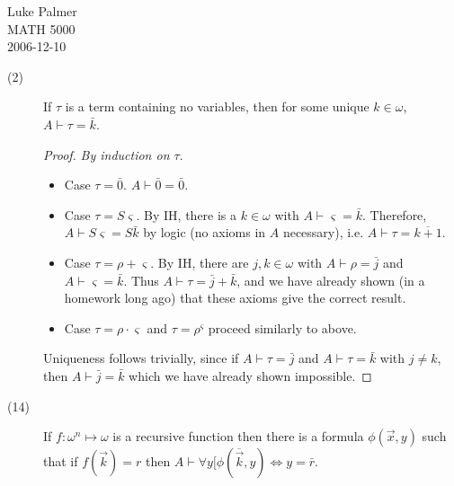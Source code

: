 \documentclass[12pt]{article}
\newcommand{\proves}[0]{\vdash}
\begin{document}
\noindent Luke Palmer \\
MATH 5000 \\
2006-12-10

\begin{description}
\item[(2)] If $\tau$ is a term containing no variables, then for some
unique $k \in \omega$, $A \proves \tau = \bar{k}$.
  \begin{proof}
  \textit{By induction on $\tau$}.
  \begin{itemize}
    \item Case $\tau = \bar{0}$.  $A \proves \bar{0} = \bar{0}$.
	\item Case $\tau = S\varsigma$.  By IH, there is a $k \in \omega$
	with $A \proves \varsigma = \bar{k}$.  Therefore, $A \proves
	S\varsigma = S\bar{k}$ by logic (no axioms in $A$ necessary), i.e.
	$A \proves \tau = \overline{k+1}$.
	\item Case $\tau = \rho + \varsigma$.  By IH, there are $j,k \in
	\omega$ with $A \proves \rho = \bar{j}$ and $A \proves \varsigma =
	\bar{k}$.  Thus $A \proves \tau = \bar{j} + \bar{k}$, and we have
	already shown (in a homework long ago) that these axioms give the
	correct result.
	\item Case $\tau = \rho \cdot \varsigma$ and $\tau = \rho^\varsigma$
	proceed similarly to above.
  \end{itemize}

  Uniqueness follows trivially, since if $A \proves \tau = \bar{j}$ and
  $A \proves \tau = \bar{k}$ with $j \ne k$, then $A \proves \bar{j} =
  \bar{k}$ which we have already shown impossible.
  \end{proof}

\item[(14)] If $f: \omega^n \mapsto \omega$ is a recursive function then
  there is a formula $\phi(\vec{x}, y)$ such that if $f(\vec{k}) = r$ then
  $A \proves \forall y [\phi(\overline{\vec{k}}, y) \Leftrightarrow y =
  \bar{r}$.
\end{description}
\end{document}
